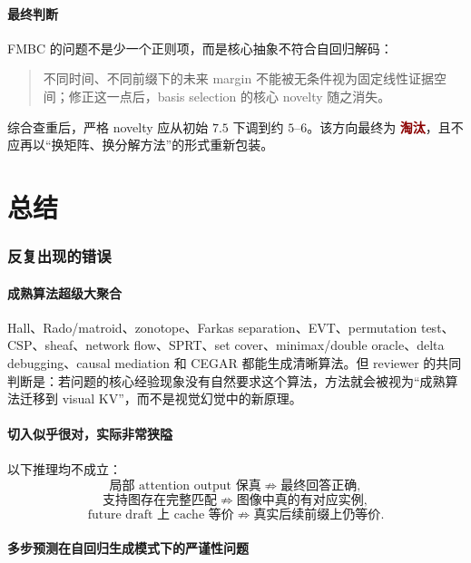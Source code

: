 \documentclass[UTF8,zihao=-4,a4paper]{ctexart}
\newcommand{\reject}{\textcolor{darkred}{\textbf{淘汰}}}
\begin{document}
\subsection{最终判断}

FMBC 的问题不是少一个正则项，而是核心抽象不符合自回归解码：

\begin{quote}
不同时间、不同前缀下的未来 margin 不能被无条件视为固定线性证据空间；修正这一点后，basis selection 的核心 novelty 随之消失。
\end{quote}

综合查重后，严格 novelty 应从初始 $7.5$ 下调到约 $5$--$6$。该方向最终为 \reject，且不应再以“换矩阵、换分解方法”的形式重新包装。

\clearpage
\part{总结}

\section{反复出现的错误}

\subsection{成熟算法超级大聚合}

Hall、Rado/matroid、zonotope、Farkas separation、EVT、permutation test、CSP、sheaf、network flow、SPRT、set cover、minimax/double oracle、delta debugging、causal mediation 和 CEGAR 都能生成清晰算法。但 reviewer 的共同判断是：若问题的核心经验现象没有自然要求这个算法，方法就会被视为“成熟算法迁移到 visual KV”，而不是视觉幻觉中的新原理。

\subsection{切入似乎很对，实际非常狭隘}

以下推理均不成立：
\[
\text{局部 attention output 保真}
\not\Rightarrow
\text{最终回答正确},
\]
\[
\text{支持图存在完整匹配}
\not\Rightarrow
\text{图像中真的有对应实例},
\]
\[
\text{future draft 上 cache 等价}
\not\Rightarrow
\text{真实后续前缀上仍等价}.
\]

\subsection{多步预测在自回归生成模式下的严谨性问题}
\end{document}
